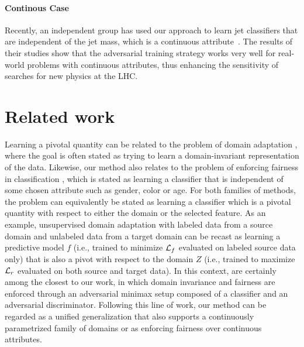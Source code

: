 \documentclass{article}
\theoremstyle{plain}
\begin{document}
\paragraph{Continous Case}
Recently, an independent group has used our approach to learn jet classifiers
that are independent of the jet mass, which is a continuous attribute~\citep{Shimmin:2017mfk}.
The results of their studies show that the adversarial training strategy works very well for
real-world problems with continuous attributes, thus enhancing the sensitivity of searches for
new physics at the LHC.



\section{Related work}
\label{sec:related}

Learning a pivotal quantity can be related to the problem
of domain adaptation
\citep{blitzer2006domain,pan2011domain,gopalan2011domain,gong2013connecting,baktashmotlagh2013unsupervised,ajakan2014domain,ganin2014unsupervised},
where the goal is often stated as trying to learn a domain-invariant
representation of the data. Likewise, our method also relates to the problem of
enforcing fairness in classification
\citep{kamishima2012fairness,zemel2013learning,feldman2015certifying,EdwardsS15,zafar2015fairness,louizos2015variational},
which is stated as learning a classifier that is independent of some chosen
attribute such as gender, color or age. For both families of methods, the
problem can equivalently be stated as learning a classifier which is a pivotal
quantity with respect to either the domain or the selected feature. As an
example, unsupervised domain adaptation with labeled data from a source domain
and unlabeled data from a target domain can be recast as learning a predictive
model $f$ (i.e., trained to minimize ${\cal L}_f$ evaluated on labeled source
data only) that is also a pivot with respect to the domain $Z$ (i.e., trained to
maximize ${\cal L}_r$ evaluated on both source and target data). In this
context, \citep{ganin2014unsupervised,EdwardsS15} are certainly among the
closest to our work, in which domain invariance and fairness are enforced
through an adversarial minimax setup composed of a classifier and an adversarial
discriminator. Following this line of work, our method can be regarded as a unified generalization that also supports
a continuously parametrized family of domains or as enforcing fairness over
continuous attributes.
\end{document}
